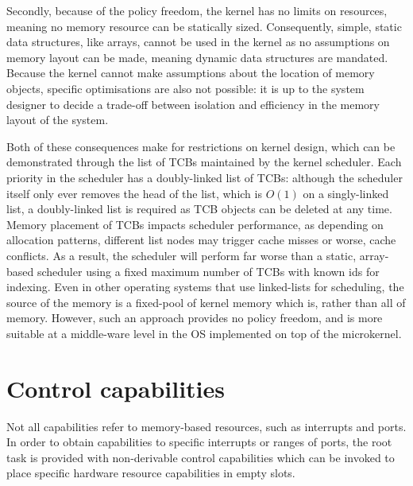 Secondly, because of the policy freedom, the kernel has no limits on resources, meaning no memory
resource can be statically sized. Consequently, simple, static data structures, like arrays, cannot
be used in the kernel as no assumptions on memory layout can be made, meaning dynamic data
structures are mandated. Because the kernel cannot make assumptions about the location of memory
objects, specific optimisations are also not possible: it is up to the system designer to decide a trade-off
between isolation and efficiency in the memory layout of the system.

Both of these consequences make for restrictions on kernel design, which can be demonstrated through
the list of TCBs maintained by the kernel scheduler. Each priority in the scheduler has a
doubly-linked list of TCBs: although the scheduler itself only ever removes the head of the list,
which is $O(1)$ on a singly-linked list, a doubly-linked list is required as TCB objects can be
deleted at any time. Memory placement of TCBs impacts scheduler performance, as depending on
allocation patterns, different list nodes may trigger cache misses or worse, cache conflicts. As a
result, the scheduler will perform far worse than a static, array-based scheduler using a fixed
maximum number of TCBs with known ids for indexing. Even in
other operating systems that use linked-lists for scheduling, the source of the memory is a
fixed-pool of kernel memory which is, rather than all of memory. However, such an approach provides no policy
freedom, and is more suitable at a middle-ware level in the \gls{OS} implemented on top of the
microkernel. 

\section{Control capabilities}
\label{s:control-capabilities}

Not all capabilities refer to memory-based resources, such as interrupts and \IO ports.
In order to obtain capabilities to specific interrupts or ranges of \IO ports, the root task is
provided with non-derivable control capabilities which can be invoked to place specific hardware
resource capabilities in empty slots.

